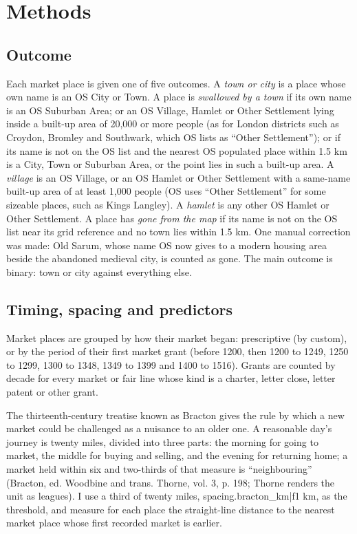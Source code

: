 \documentclass[11pt,a4paper]{article}
\begin{document}
\section{Methods}

\subsection{Outcome}

Each market place is given one of five outcomes. A \emph{town or city} is a place whose own name is an OS City or Town. A place is \emph{swallowed by a town} if its own name is an OS Suburban Area; or an OS Village, Hamlet or Other Settlement lying inside a built-up area of 20,000 or more people (as for London districts such as Croydon, Bromley and Southwark, which OS lists as ``Other Settlement''); or if its name is not on the OS list and the nearest OS populated place within 1.5 km is a City, Town or Suburban Area, or the point lies in such a built-up area. A \emph{village} is an OS Village, or an OS Hamlet or Other Settlement with a same-name built-up area of at least 1,000 people (OS uses ``Other Settlement'' for some sizeable places, such as Kings Langley). A \emph{hamlet} is any other OS Hamlet or Other Settlement. A place has \emph{gone from the map} if its name is not on the OS list near its grid reference and no town lies within 1.5 km. One manual correction was made: Old Sarum, whose name OS now gives to a modern housing area beside the abandoned medieval city, is counted as gone. The main outcome is binary: town or city against everything else.

\subsection{Timing, spacing and predictors}

Market places are grouped by how their market began: prescriptive (by custom), or by the period of their first market grant (before 1200, then 1200 to 1249, 1250 to 1299, 1300 to 1348, 1349 to 1399 and 1400 to 1516). Grants are counted by decade for every market or fair line whose kind is a charter, letter close, letter patent or other grant.

The thirteenth-century treatise known as Bracton gives the rule by which a new market could be challenged as a nuisance to an older one. A reasonable day's journey is twenty miles, divided into three parts: the morning for going to market, the middle for buying and selling, and the evening for returning home; a market held within six and two-thirds of that measure is ``neighbouring'' (Bracton, ed. Woodbine and trans. Thorne, vol. 3, p. 198; Thorne renders the unit as leagues). I use a third of twenty miles, {{spacing.bracton_km|f1}} km, as the threshold, and measure for each place the straight-line distance to the nearest market place whose first recorded market is earlier.
\end{document}
